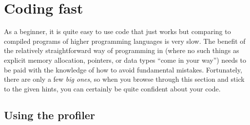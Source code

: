 %
% 
% 
% 
%
\newpage
\section{Coding fast}

As a \matlab{} beginner, it is quite easy to use code that just works\texttrademark{} but comparing to compiled programs of higher programming languages is very slow. The benefit of the relatively straightforward way of programming in \matlab{} (where no such things as explicit memory allocation, pointers, or data types ``come in your way'') needs to be paid with the knowledge of how to avoid fundamental mistakes. Fortunately, there are only a few \emph{big ones}, so when you browse through this section and stick to the given hints, you can certainly be quite confident about your code.

\subsection{Using the profiler}


